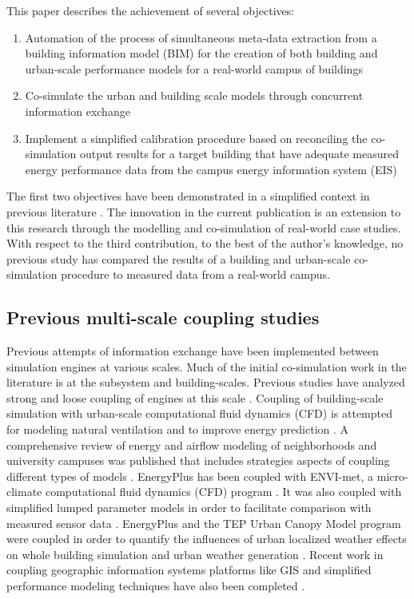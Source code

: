 \documentclass{tBPS2e}
\theoremstyle{plain}
\theoremstyle{definition}
\theoremstyle{remark}
\begin{document}
This paper describes the achievement of several objectives:
\begin{enumerate}
  \item Automation of the process of simultaneous meta-data extraction from a building information model (BIM) for the creation of both building and urban-scale performance models for a real-world campus of buildings
  \item Co-simulate the urban and building scale models through concurrent information exchange
  \item Implement a simplified calibration procedure based on reconciling the co-simulation output results for a target building that have adequate measured energy performance data from the campus energy information system (EIS) 
\end{enumerate}

The first two objectives have been demonstrated in a simplified context in previous literature \citep{thomas2014multiscale,Miller:2015vk}. The innovation in the current publication is an extension to this research through the modelling and co-simulation of real-world case studies. With respect to the third contribution, to the best of the author's knowledge, no previous study has compared the results of a building and urban-scale co-simulation procedure to measured data from a real-world campus. 

\subsection{Previous multi-scale coupling studies}
Previous attempts of information exchange have been implemented between simulation engines at various scales. Much of the initial co-simulation work in the literature is at the subsystem and building-scales. Previous studies have analyzed strong and loose coupling of engines at this scale \citep{Trcka:2010cr,Wetter:2011kh}. Coupling of building-scale simulation with urban-scale computational fluid dynamics (CFD) is attempted for modeling natural ventilation \citep{Zhang:2013vx} and to improve energy prediction \citep{Bouyer:2011eha}. A comprehensive review of energy and airflow modeling of neighborhoods and university campuses was published that includes strategies aspects of coupling different types of models \citep{Srebric:2015gq}. EnergyPlus has been coupled with ENVI-met, a micro-climate computational fluid dynamics (CFD) program \citep{Yang:2012cr}. It was also coupled with simplified lumped parameter models in order to facilitate comparison with measured sensor data \citep{Martin:2015fj}. EnergyPlus and the TEP Urban Canopy Model program were coupled in order to quantify the influences of urban localized weather effects on whole building simulation \citep{Bueno:2011hi} and urban weather generation \citep{Bueno:2013hh}. Recent work in coupling geographic information systems platforms like GIS and simplified performance modeling techniques have also been completed \citep{Fonseca:2015bm}.
\end{document}
